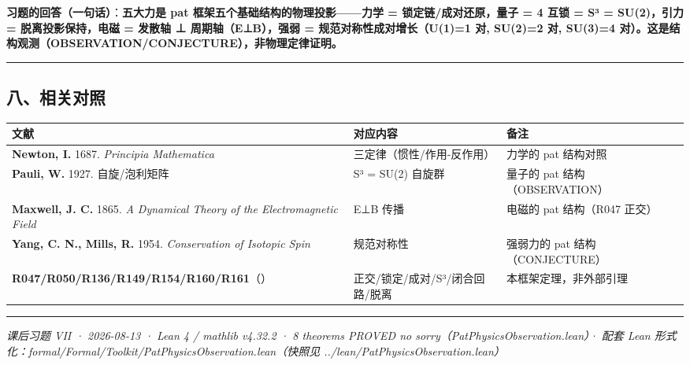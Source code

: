 \documentclass[
]{article}
\newcounter{none} %
\begin{document}
\textbf{习题的回答（一句话）}：\textbf{五大力是 pat
框架五个基础结构的物理投影------力学 = 锁定链/成对还原，量子 = 4 互锁 =
S³ = SU(2)，引力 = 脱离投影保持，电磁 = 发散轴 ⊥ 周期轴（E⊥B），强弱 =
规范对称性成对增长（U(1)=1 对, SU(2)=2 对, SU(3)=4
对）。这是结构观测（OBSERVATION/CONJECTURE），非物理定律证明。}

\begin{center}\rule{0.5\linewidth}{0.5pt}\end{center}

\subsection{八、相关对照}\label{ux516bux76f8ux5173ux5bf9ux7167}

{\def\LTcaptype{none} %
\begin{longtable}[]{@{}
 >{\raggedright\arraybackslash}p{}
 >{\raggedright\arraybackslash}p{}
 >{\raggedright\arraybackslash}p{}@{}}
\toprule\noalign{}
\begin{minipage}[b]{\linewidth}\raggedright
文献
\end{minipage} & \begin{minipage}[b]{\linewidth}\raggedright
对应内容
\end{minipage} & \begin{minipage}[b]{\linewidth}\raggedright
备注
\end{minipage} \\
\midrule\noalign{}
\endhead
\bottomrule\noalign{}
\endlastfoot
\textbf{Newton, I.} 1687. \emph{Principia Mathematica} &
三定律（惯性/作用-反作用） & 力学的 pat 结构对照 \\
\textbf{Pauli, W.} 1927. 自旋/泡利矩阵 & S³ = SU(2) 自旋群 & 量子的 pat
结构（OBSERVATION） \\
\textbf{Maxwell, J. C.} 1865. \emph{A Dynamical Theory of the
Electromagnetic Field} & E⊥B 传播 & 电磁的 pat 结构（R047 正交） \\
\textbf{Yang, C. N., Mills, R.} 1954. \emph{Conservation of Isotopic
Spin} & 规范对称性 & 强弱力的 pat 结构（CONJECTURE） \\
\textbf{R047/R050/R136/R149/R154/R160/R161}（） &
正交/锁定/成对/S³/闭合回路/脱离 & 本框架定理，非外部引理 \\
\end{longtable}
}

\begin{center}\rule{0.5\linewidth}{0.5pt}\end{center}

\emph{课后习题 VII · 2026-08-13 · Lean 4 / mathlib v4.32.2 · 8
theorems PROVED no sorry（PatPhysicsObservation.lean）· 配套 Lean
形式化：formal/Formal/Toolkit/PatPhysicsObservation.lean（快照见
../lean/PatPhysicsObservation.lean）}
\end{document}
